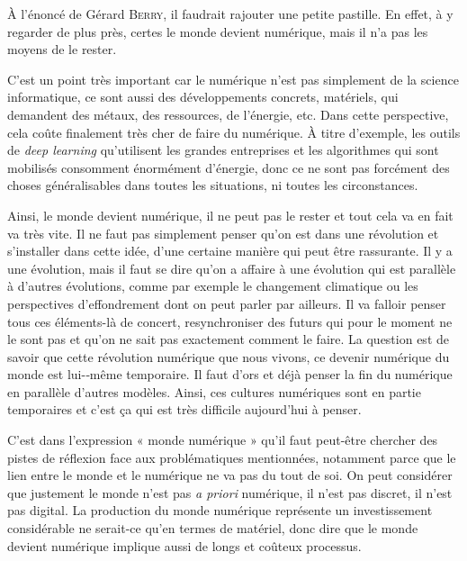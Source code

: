 
À l'énoncé de Gérard \textsc{Berry}, il faudrait rajouter une petite pastille. En effet, à y regarder de plus près, certes le monde devient numérique, mais il n'a pas les moyens de le rester.

C'est un point très important car le numérique n'est pas simplement de la science informatique, ce sont aussi des développements concrets, matériels, qui demandent des métaux, des ressources, de l'énergie, etc. Dans cette perspective, cela coûte finalement très cher de faire du numérique. À titre d'exemple, les outils de \textit{deep learning} qu'utilisent les grandes entreprises et les algorithmes qui sont mobilisés consomment énormément d'énergie, donc ce ne sont pas forcément des choses généralisables dans toutes les situations, ni toutes les circonstances. 

Ainsi, le monde devient numérique, il ne peut pas le rester et tout cela va en fait va très vite. Il ne faut pas simplement penser qu'on est dans une révolution et s'installer dans cette idée, d'une certaine manière qui peut être rassurante. Il y a une évolution, mais il faut se dire qu'on a affaire à une évolution qui est parallèle à d'autres évolutions, comme par exemple le changement climatique ou les perspectives d'effondrement dont on peut parler par ailleurs. Il va falloir penser tous ces éléments-là de concert, resynchroniser des futurs qui pour le moment ne le sont pas et qu'on ne sait pas exactement comment le faire. La question est de savoir que cette révolution numérique que nous vivons, ce devenir numérique du monde est lui-­‐même temporaire. Il faut d'ors et déjà penser la 
fin du numérique en parallèle d'autres modèles. Ainsi, ces cultures numériques sont en partie temporaires et c'est ça qui est très difficile aujourd'hui à penser.


C'est dans l'expression « monde numérique » qu'il faut peut-être chercher des pistes de réflexion face aux problématiques mentionnées, notamment parce que le lien entre le monde et le numérique ne va pas du tout de soi. On peut considérer que justement le monde n'est pas \textit{a priori} numérique, il n'est pas discret, il n'est pas \gls{digital}. La production du monde numérique représente un investissement considérable ne serait-ce qu'en termes de matériel, donc dire que le monde devient numérique implique aussi de longs et coûteux processus.

